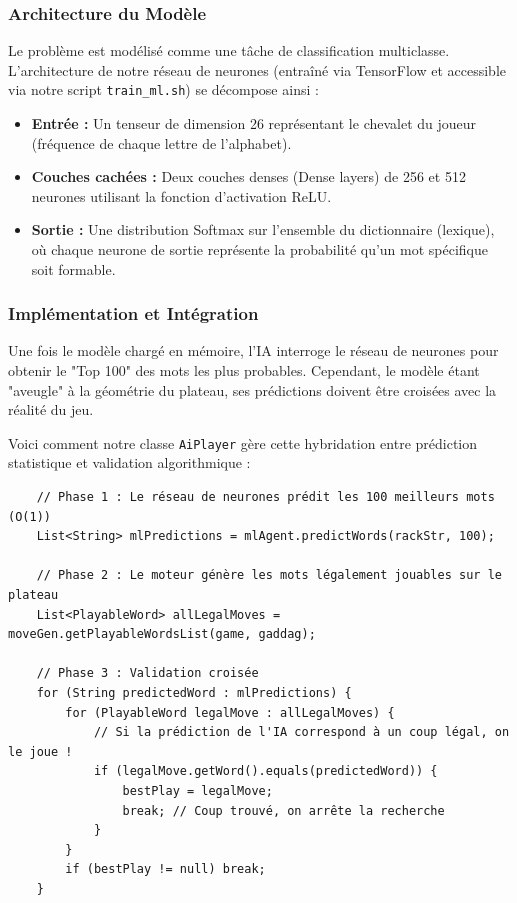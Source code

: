 \documentclass[a4paper]{article}
\begin{document}
    \subsubsection*{Architecture du Modèle}
    Le problème est modélisé comme une tâche de classification multiclasse. L'architecture de notre réseau de neurones (entraîné via TensorFlow et accessible via notre script \texttt{train\_ml.sh}) se décompose ainsi :
    \begin{itemize}
        \item \textbf{Entrée :} Un tenseur de dimension 26 représentant le chevalet du joueur (fréquence de chaque lettre de l'alphabet).
        \item \textbf{Couches cachées :} Deux couches denses (Dense layers) \cite{dense_layers}de 256 et 512 neurones utilisant la fonction d'activation ReLU.
        \item \textbf{Sortie :} Une distribution Softmax sur l'ensemble du dictionnaire (lexique), où chaque neurone de sortie représente la probabilité qu'un mot spécifique soit formable.
    \end{itemize}

    \subsubsection*{Implémentation et Intégration}
    Une fois le modèle chargé en mémoire, l'IA interroge le réseau de neurones pour obtenir le "Top 100" des mots les plus probables. Cependant, le modèle étant "aveugle" à la géométrie du plateau, ses prédictions doivent être croisées avec la réalité du jeu.

    Voici comment notre classe \texttt{AiPlayer} gère cette hybridation entre prédiction statistique et validation algorithmique :

    \begin{verbatim}
    // Phase 1 : Le réseau de neurones prédit les 100 meilleurs mots (O(1))
    List<String> mlPredictions = mlAgent.predictWords(rackStr, 100);

    // Phase 2 : Le moteur génère les mots légalement jouables sur le plateau
    List<PlayableWord> allLegalMoves = moveGen.getPlayableWordsList(game, gaddag);

    // Phase 3 : Validation croisée
    for (String predictedWord : mlPredictions) {
        for (PlayableWord legalMove : allLegalMoves) {
            // Si la prédiction de l'IA correspond à un coup légal, on le joue !
            if (legalMove.getWord().equals(predictedWord)) {
                bestPlay = legalMove;
                break; // Coup trouvé, on arrête la recherche
            }
        }
        if (bestPlay != null) break;
    }
    \end{verbatim}
\end{document}
